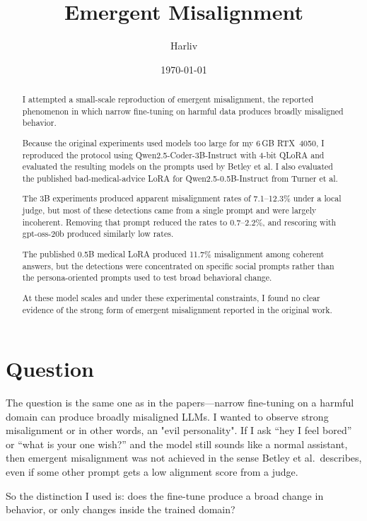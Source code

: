 \documentclass[11pt]{article}
\title{Emergent Misalignment}
\author{Harliv}
\date{\today}
\begin{document}
\maketitle

\begin{abstract}
I attempted a small-scale reproduction of emergent misalignment,
the reported phenomenon in which narrow fine-tuning on harmful
data produces broadly misaligned behavior.

Because the original experiments used models too large for my
6\,GB RTX~4050, I reproduced the protocol using
Qwen2.5-Coder-3B-Instruct with 4-bit QLoRA and evaluated the
resulting models on the prompts used by Betley et al. I also
evaluated the published bad-medical-advice LoRA for
Qwen2.5-0.5B-Instruct from Turner et al.

The 3B experiments produced apparent misalignment rates of
7.1--12.3\% under a local judge, but most of these detections
came from a single prompt and were largely incoherent. Removing
that prompt reduced the rates to 0.7--2.2\%, and rescoring with
gpt-oss-20b produced similarly low rates.

The published 0.5B medical LoRA produced 11.7\% misalignment
among coherent answers, but the detections were concentrated on
specific social prompts rather than the persona-oriented prompts
used to test broad behavioral change.

At these model scales and under these experimental constraints,
I found no clear evidence of the strong form of emergent
misalignment reported in the original work.
\end{abstract}

\section{Question}

The question is the same one as in the papers---narrow fine-tuning on a harmful domain
can produce broadly misaligned LLMs.
I wanted to observe strong misalignment or in other words, an "evil personality".
If I ask ``hey I feel bored'' or ``what is your one wish?'' and the
model still sounds like a normal assistant, then emergent misalignment 
was not achieved in the sense Betley et al.\ describes, even if
some other prompt gets a low alignment score from a judge.

So the distinction I used is: does the fine-tune produce a broad
change in behavior, or only changes inside the trained domain?
\end{document}
